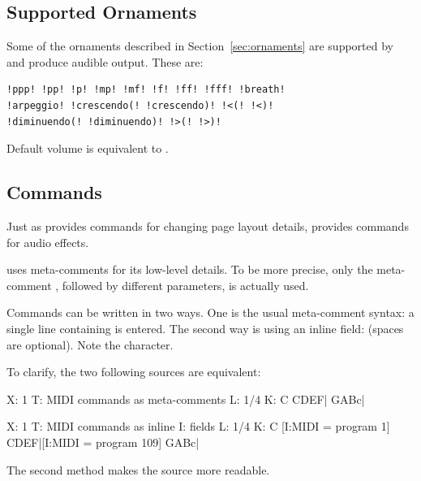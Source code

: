 \documentclass[a4paper,12pt]{book}
\begin{document}

\subsection{Supported Ornaments}
\label{sec:midiornaments}

Some of the ornaments described in Section~\ref{sec:ornaments} are
supported by \abcMID{} and produce audible output. These are:

\begin{verbatim}
!ppp! !pp! !p! !mp! !mf! !f! !ff! !fff! !breath!
!arpeggio! !crescendo(! !crescendo)! !<(! !<)!
!diminuendo(! !diminuendo)! !>(! !>)!
\end{verbatim}

Default volume is equivalent to . 


\subsection{ Commands}

Just as \abcm{} provides commands for changing page layout details,
\abcmid{} provides commands for audio effects.

\abcmid{} uses meta-comments for its low-level details. To be more
precise, only the meta-comment , followed by different
parameters, is actually used.

Commands can be written in two ways. One is the usual meta-comment
syntax: a single line containing  is entered. The second way is using an inline 
 field: \cmd{[I:MIDI = \parm{command} \parm{parameters}]}
(spaces are optional). Note the \cmd{=} character.


To clarify, the two following sources are equivalent:

\begin{abcsource}
X: 1
T: MIDI commands as meta-comments
L: 1/4
K: C
CDEF|
GABc|
\end{abcsource}

\begin{abcsource}
X: 1
T: MIDI commands as inline I: fields
L: 1/4
K: C
[I:MIDI = program 1] CDEF|[I:MIDI = program 109] GABc|
\end{abcsource}

The second method makes the source more readable.
\end{document}
